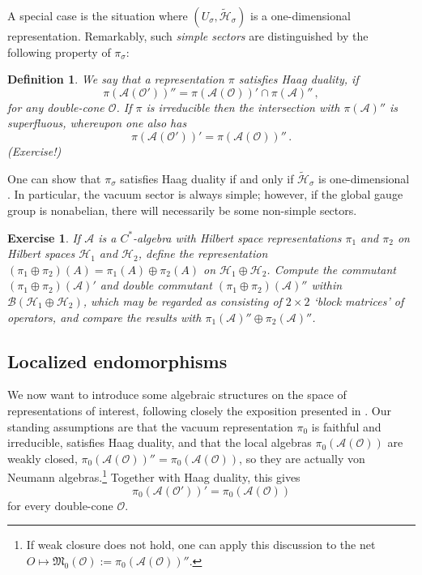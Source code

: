 \documentclass[12pt]{article}
\newcommand{\1}{\mathds{1}}                         %
\newcommand{\Hcal}{\mathcal {H}}
\newcommand{\Ocal}{\mathcal{O}}
\newcommand{\BB}{{\mathcal{B}}}
\newcommand{\HH}{{\mathcal{H}}}
\newcommand{\Mf}{{\mathfrak{M}}}
\newcommand{\Ac}{{\mathcal{A}}}
\newcommand{\be}{\begin{equation}}
\newcommand{\ee}{\end{equation}}
\newtheorem{exercise}[theorem]{Exercise}
\newtheorem{df}[theorem]{Definition}}
\begin{document}
 A special case is the situation where $(U_\sigma,\tilde{\Hcal}_\sigma)$ is a one-dimensional representation. 
  Remarkably, such \emph{simple sectors} are distinguished by the following property of $\pi_\sigma$:
\begin{df}
	We say that a representation $\pi$ satisfies \emph{Haag duality}, if  
				\be\label{Haagdual}
				\pi(\Ac(\Ocal'))''=\pi(\Ac(\Ocal))'\cap \pi(\Ac)''\,,
				\ee 
				for any double-cone $\Ocal$. 
				If $\pi$ is irreducible then the intersection with $\pi(\Ac)''$ is superfluous, 
				whereupon one also has
				\be\label{Haagdual2}
			 \pi(\Ac(\Ocal'))'=\pi(\Ac(\Ocal))''\,.
			 \ee
			(\emph{Exercise!})
\end{df}
One can show that $\pi_\sigma$ satisfies Haag duality if and only if $\tilde{\Hcal}_\sigma$ is one-dimensional \cite{DHR1}.  In particular, the vacuum sector is always simple; however, if the 
global gauge group is nonabelian, there will necessarily be some non-simple sectors.

\begin{exercise}
	If $\Ac$ is a $C^*$-algebra with Hilbert space representations $\pi_1$ and $\pi_2$ on Hilbert spaces $\HH_1$ and $\HH_2$, define the representation $(\pi_1\oplus\pi_2)(A)=\pi_1(A)\oplus \pi_2(A)$ on $\HH_1\oplus\HH_2$. Compute
	the commutant $(\pi_1\oplus\pi_2)(\Ac)'$ and double commutant $(\pi_1\oplus\pi_2)(\Ac)''$ within $\BB(\HH_1\oplus\HH_2)$, which may be regarded as consisting of $2\times 2$ `block matrices' of operators, and compare the results with $\pi_1(\Ac)''\oplus \pi_2(\Ac)''$. 
\end{exercise}
 

\subsection{Localized endomorphisms}
We now want to introduce some algebraic structures on the space  of representations of interest, following closely the exposition presented in \cite{KlausSuperselection}. Our standing assumptions are that the vacuum representation $\pi_0$ is faithful and irreducible, satisfies Haag duality, and that the local algebras $\pi_0(\Ac(\Ocal))$ are weakly closed, $\pi_0(\Ac(\Ocal))''=\pi_0(\Ac(\Ocal))$, so they are actually von Neumann algebras.\footnote{If weak closure does not hold, one can apply this discussion to the net $O\mapsto \Mf_0(\Ocal):=\pi_0(\Ac(\Ocal))''$.} Together with Haag duality, this gives
\be\label{Haagdual3}
			 \pi_0(\Ac(\Ocal'))'=\pi_0(\Ac(\Ocal))
\ee
for every double-cone $\Ocal$.
\end{document}

